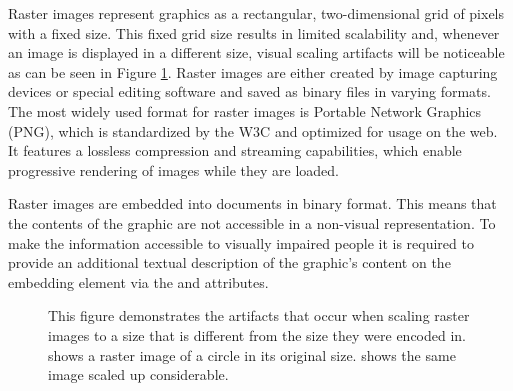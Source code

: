 Raster images represent graphics as a rectangular, two-dimensional grid of pixels with a fixed size. 
This fixed grid size results in limited scalability and, whenever an image is displayed in a different size, visual scaling artifacts will be noticeable as can be seen in Figure \ref{fig:RasterImage}. 
Raster images are either created by image capturing devices or special editing software and saved as binary files in varying formats. 
The most widely used format for raster images is Portable Network Graphics (PNG), which is standardized by the W3C \parencite{PNG} and optimized for usage on the web. 
It features a lossless compression and streaming capabilities, which enable progressive rendering of images while they are loaded.

Raster images are embedded into documents in binary format. 
This means that the contents of the graphic are not accessible in a non-visual representation. 
To make the information accessible to visually impaired people it is required to provide an additional textual description of the graphic's content on the embedding element via the  and  attributes.

\begin{figure}[tp]
\centering
{}
\caption[Raster Image Scaling]{
  This figure demonstrates the artifacts that occur when scaling raster images to a size that is different from the size they were encoded in.
   shows a raster image of a circle in its original size.
   shows the same image scaled up considerable. 
}
\label{fig:RasterImage}
\end{figure}

